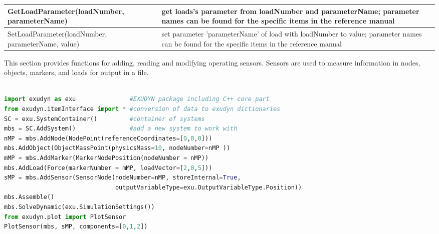 \begin{center}
\begin{longtable}{| p{8cm} | p{8cm} |}
  GetLoadParameter(loadNumber, parameterName) & get loads's parameter from loadNumber and parameterName; parameter names can be found for the specific items in the reference manual\\ \hline 
  SetLoadParameter(loadNumber, parameterName, value) & set parameter 'parameterName' of load with loadNumber to value; parameter names can be found for the specific items in the reference manual\\ \hline 
\end{longtable}
\end{center}

\label{sec:mainsystem:sensor}



This section provides functions for adding, reading and modifying operating sensors. Sensors are used to measure information in nodes, objects, markers, and loads for output in a file.
\pythonstyle
\begin{lstlisting}[language=Python, firstnumber=1]

import exudyn as exu               #EXUDYN package including C++ core part
from exudyn.itemInterface import * #conversion of data to exudyn dictionaries
SC = exu.SystemContainer()         #container of systems
mbs = SC.AddSystem()               #add a new system to work with
nMP = mbs.AddNode(NodePoint(referenceCoordinates=[0,0,0]))
mbs.AddObject(ObjectMassPoint(physicsMass=10, nodeNumber=nMP ))
mMP = mbs.AddMarker(MarkerNodePosition(nodeNumber = nMP))
mbs.AddLoad(Force(markerNumber = mMP, loadVector=[2,0,5]))
sMP = mbs.AddSensor(SensorNode(nodeNumber=nMP, storeInternal=True,
                               outputVariableType=exu.OutputVariableType.Position))
mbs.Assemble()
mbs.SolveDynamic(exu.SimulationSettings())
from exudyn.plot import PlotSensor
PlotSensor(mbs, sMP, components=[0,1,2])
\end{lstlisting}

